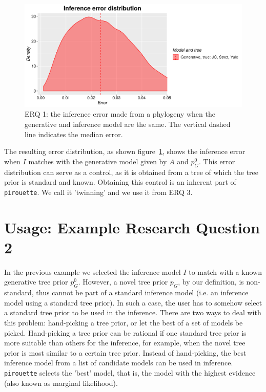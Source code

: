 \documentclass{article}
\begin{document}
\begin{figure}[H]
  \includegraphics[width=\textwidth]{example_1/errors.png}
  \caption{
    ERQ 1: the inference error made from a phylogeny 
    when the generative and inference model are the same.
    The vertical dashed line indicates the median error.
  }
  \label{fig:example_1}
\end{figure}

The resulting error distribution, as shown figure~\ref{fig:example_1},
shows the inference error 
when $\mathit{I}$ matches with the generative model given 
by $\mathit{A}$ and $\mathit{p_{G}^0}$.
This error distribution can serve as a control,
as it is obtained from a tree of which the tree prior is standard and known.
Obtaining this control is an inherent part of \verb;pirouette;. 
We call it 'twinning' and we use it from ERQ 3.

\section{Usage: Example Research Question 2}

In the previous example we selected the inference model $\mathit{I}$ to match 
with a known generative tree prior $\mathit{p_{G}^0}$.
However, a novel tree prior $\mathit{p_{G}}$, by our definition, is non-standard, 
thus cannot be part of a standard inference 
model (i.e. an inference model using a standard tree prior).
In such a case, the user has to somehow select 
a standard tree prior to be 
used in the inference.
There are two ways to deal with this problem: hand-picking a tree
prior, or let the best of a set of models be picked. 
Hand-picking a tree prior can be rational if one standard tree prior 
is more suitable than others for the inference, for example, when
the novel tree prior is most similar to a certain tree prior.
Instead of hand-picking, the best inference model from a list of candidate 
models can be used in inference.
\verb;pirouette; selects the 'best' model, that is, 
the model with the highest evidence (also known as marginal likelihood). 
\end{document}
